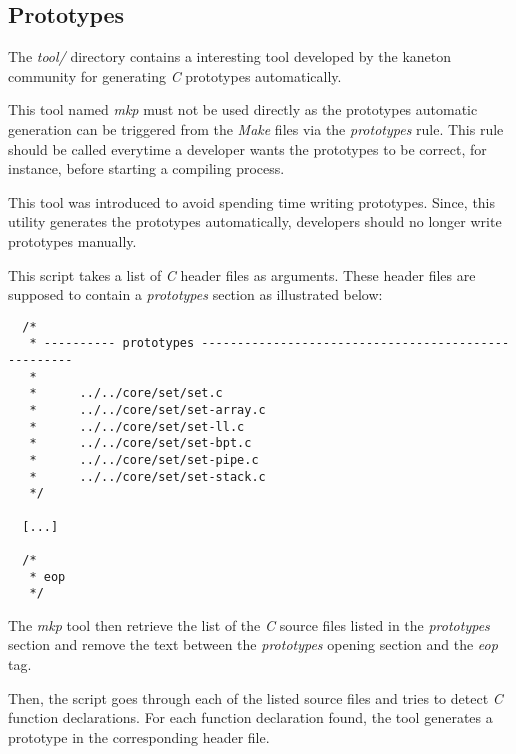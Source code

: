 %
%
%
%
%
%

%
%

\subsection{Prototypes}
\label{section:prototypes}

The \textit{tool/} directory contains a interesting tool developed by
the kaneton community for generating \textit{C} prototypes automatically.

This tool named \textit{mkp} must not be used directly as the prototypes
automatic generation can be triggered from the \textit{Make} files via the
\textit{prototypes} rule. This rule should be called everytime a developer
wants the prototypes to be correct, for instance, before starting a compiling
process.

This tool was introduced to avoid spending time writing prototypes.
Since, this utility generates the prototypes automatically, developers
should no longer write prototypes manually.

This script takes a list of \textit{C} header files as arguments. These header
files are supposed to contain a \textit{prototypes} section as illustrated
below:

\begin{verbatim}
  /*
   * ---------- prototypes ----------------------------------------------------
   *
   *      ../../core/set/set.c
   *      ../../core/set/set-array.c
   *      ../../core/set/set-ll.c
   *      ../../core/set/set-bpt.c
   *      ../../core/set/set-pipe.c
   *      ../../core/set/set-stack.c
   */

  [...]

  /*
   * eop
   */
\end{verbatim}

The \textit{mkp} tool then retrieve the list of the \textit{C} source files
listed in the \textit{prototypes} section and remove the text between
the \textit{prototypes} opening section and the \textit{eop} tag.

Then, the script goes through each of the listed source files and tries to
detect \textit{C} function declarations. For each function declaration found,
the tool generates a prototype in the corresponding header file.

